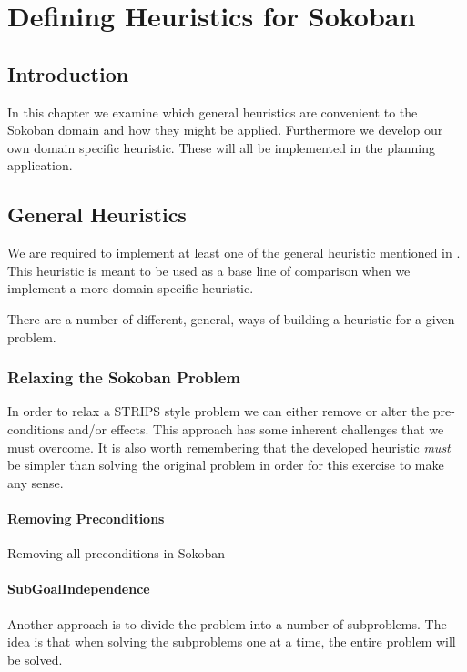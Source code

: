 \chapter{Defining Heuristics for Sokoban}
\label{cha:heuristics}

\section{Introduction}
In this chapter we examine which general heuristics are convenient to
the Sokoban domain and how they might be applied. Furthermore we
develop our own domain specific heuristic. These will all be
implemented in the planning application.

\section{General Heuristics}
We are required to implement at least one of the general heuristic
mentioned in \citet{Russell2003GeneralHeuristics}. This heuristic is
meant to be used as a base line of comparison when we implement a more
domain specific heuristic.

There are a number of different, general, ways of building a heuristic
for a given problem. 

\subsection{Relaxing the Sokoban Problem}
In order to relax a STRIPS style problem we can either remove or alter
the pre-conditions and/or effects. This approach has some inherent
challenges that we must overcome. It is also worth remembering that
the developed heuristic \emph{must} be simpler than solving the
original problem in order for this exercise to make any sense.

\subsubsection{Removing Preconditions}
Removing all preconditions in Sokoban 

\subsubsection{SubGoalIndependence}
Another approach is to divide the problem into a number of subproblems. The idea is that when solving the subproblems one at a time, the entire problem will be solved.

